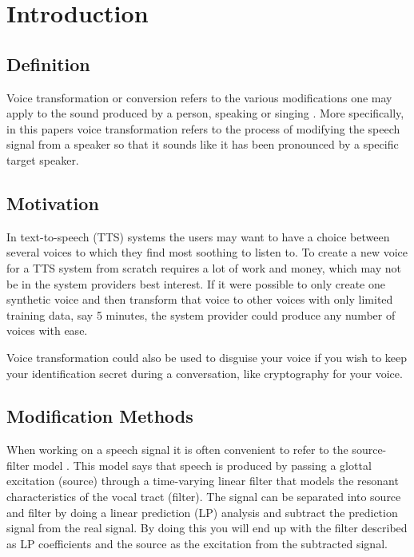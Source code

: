 \chapter{Introduction} %
\label{cha:introduction}
  

\section{Definition} %
\label{sec:definition}
Voice transformation or conversion refers to the various modifications one may apply to the sound produced by a person, speaking or singing \cite{stylianou08}. More specifically, in this papers voice transformation refers to the process of modifying the speech signal from a speaker so that it sounds like it has been pronounced by a specific target speaker. 

\section{Motivation} %
\label{sec:motivation}
In text-to-speech (TTS) systems the users may want to have a choice between several voices to which they find most soothing to listen to. To create a new voice for a TTS system from scratch requires a lot of work and money, which may not be in the system providers best interest. If it were possible to only create one synthetic voice and then transform that voice to other voices with only limited training data, say 5 minutes, the system provider could produce any number of voices with ease. 

Voice transformation could also be used to disguise your voice if you wish to keep your identification secret during a conversation, like cryptography for your voice. 

\section{Modification Methods} %
\label{sec:synthesis_methods}
When working on a speech signal it is often convenient to refer to the source-filter model \cite{taletek}. This model says that speech is produced by passing a glottal excitation (source) through a time-varying linear filter that models the resonant characteristics of the vocal tract (filter). The signal can be separated into source and filter by doing a linear prediction (LP) analysis and subtract the prediction signal from the real signal. By doing this you will end up with the filter described as LP coefficients and the source as the excitation from the subtracted signal.

